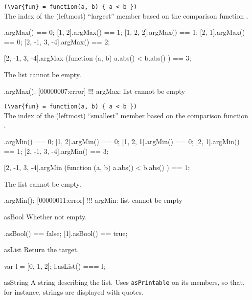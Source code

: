 \begin{urbiscriptapi}
\item {}\lstinline|(\var{fun} = function(a, b) { a < b })|\\%
  The index of the (leftmost) ``largest'' member based on the comparison
  function .
\begin{urbiassert}
           [1].argMax() == 0;
        [1, 2].argMax() == 1;
     [1, 2, 2].argMax() == 1;
        [2, 1].argMax() == 0;
[2, -1, 3, -4].argMax() == 2;

[2, -1, 3, -4].argMax (function (a, b) { a.abs() < b.abs() }) == 3;
\end{urbiassert}

The list cannot be empty.

\begin{urbiscript}
[].argMax();
[00000007:error] !!! argMax: list cannot be empty
\end{urbiscript}


\item {}\lstinline|(\var{fun} = function(a, b) { a < b })|\\%
  The index of the (leftmost) ``smallest'' member based on the comparison
  function .
\begin{urbiassert}
           [1].argMin() == 0;
        [1, 2].argMin() == 0;
     [1, 2, 1].argMin() == 0;
        [2, 1].argMin() == 1;
[2, -1, 3, -4].argMin() == 3;

[2, -1, 3, -4].argMin (function (a, b) { a.abs() < b.abs() }) == 1;
\end{urbiassert}

The list cannot be empty.

\begin{urbiscript}
[].argMin();
[00000011:error] !!! argMin: list cannot be empty
\end{urbiscript}


\item[asBool]
  Whether not empty.
\begin{urbiassert}
[].asBool() == false;
[1].asBool() == true;
\end{urbiassert}


\item[asList]
  Return the target.

\begin{urbiassert}
var l = [0, 1, 2];
l.asList() === l;
\end{urbiassert}


\item[asString]
  A string describing the list.  Uses \lstinline|asPrintable| on its
  members, so that, for instance, strings are displayed with quotes.


\end{urbiscriptapi}
